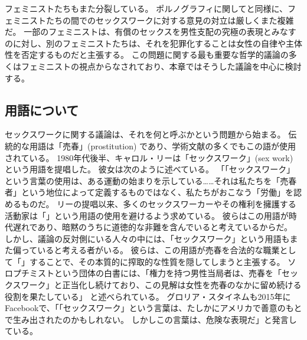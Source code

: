 \documentclass[paper=a4,book,openany]{jlreq}
\begin{document}
フェミニストたちもまた分裂している。
ポルノグラフィに関してと同様に、フェミニストたちの間でのセックスワークに対する意見の対立は厳しくまた複雑だ。
一部のフェミニストは、有償のセックスを男性支配の究極の表現とみなすのに対し、別のフェミニストたちは、それを犯罪化することは女性の自律や主体性を否定するものだと主張する。
この問題に関する最も重要な哲学的議論の多くはフェミニストの視点からなされており、本章ではそうした議論を中心に検討する。
\subsection{用語について}

セックスワークに関する議論は、それを何と呼ぶかという問題から始まる。
伝統的な用語は「売春」(prostitution) であり、学術文献の多くでもこの語が使用されている。
1980年代後半、キャロル・リーは「セックスワーク」(sex work) という用語を提唱した。
彼女は次のように述べている。
「「セックスワーク」という言葉の使用は、ある運動の始まりを示している……それは私たちを「売春者」という地位によって定義するものではなく、私たちがおこなう「労働」を認めるものだ\citep[p.230]{leigh97:_inven_sex_work}。
リーの提唱以来、多くのセックスワーカーやその権利を擁護する活動家は「」という用語の使用を避けるよう求めている。
彼らはこの用語が時代遅れであり、暗黙のうちに道徳的な非難を含んでいると考えているからだ。
しかし、議論の反対側にいる人々の中には、「セックスワーク」という用語もまた偏っていると考える者がいる。
彼らは、この用語が売春を合法的な職業として「」することで、その本質的に搾取的な性質を隠してしまうと主張する。
ソロプチミストという団体の白書には、「権力を持つ男性当局者は、売春を「セックスワーク」と正当化し続けており、この見解は女性を売春のなかに留め続ける役割を果たしている」
と述べられている\citep{soroptimist17:_prost_is_not_choic}。
グロリア・スタイネムも2015年にFacebookで、「「セックスワーク」という言葉は、たしかにアメリカで善意のもとで生み出されたのかもしれない。
しかしこの言葉は、危険な表現だ」と発言している\citep{steinem15:_faceb}。
\end{document}
